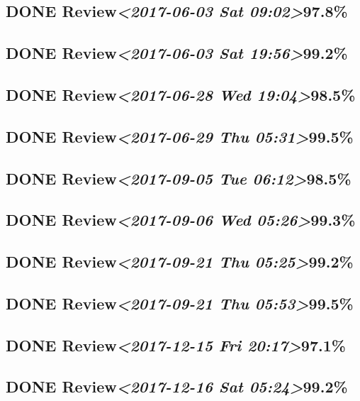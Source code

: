 \documentclass[11pt]{ctexart}
\begin{document}
\subsection{{\bfseries\sffamily DONE} Review\textit{<2017-06-03 Sat 09:02>}97.8\%}
\label{sec:orgcf6de14}
\subsection{{\bfseries\sffamily DONE} Review\textit{<2017-06-03 Sat 19:56>}99.2\%}
\label{sec:org202cb4f}
\subsection{{\bfseries\sffamily DONE} Review\textit{<2017-06-28 Wed 19:04>}98.5\%}
\label{sec:org5118a19}
\subsection{{\bfseries\sffamily DONE} Review\textit{<2017-06-29 Thu 05:31>}99.5\%}
\label{sec:orgc8f4d37}
\subsection{{\bfseries\sffamily DONE} Review\textit{<2017-09-05 Tue 06:12>}98.5\%}
\label{sec:org2004a4b}
\subsection{{\bfseries\sffamily DONE} Review\textit{<2017-09-06 Wed 05:26>}99.3\%}
\label{sec:orga8bccc1}
\subsection{{\bfseries\sffamily DONE} Review\textit{<2017-09-21 Thu 05:25>}99.2\%}
\label{sec:org64349dc}
\subsection{{\bfseries\sffamily DONE} Review\textit{<2017-09-21 Thu 05:53>}99.5\%}
\label{sec:org77e4231}

\subsection{{\bfseries\sffamily DONE} Review\textit{<2017-12-15 Fri 20:17>}97.1\%}
\label{sec:org5d2ce13}
\subsection{{\bfseries\sffamily DONE} Review\textit{<2017-12-16 Sat 05:24>}99.2\%}
\label{sec:org87713a5}
\end{document}
